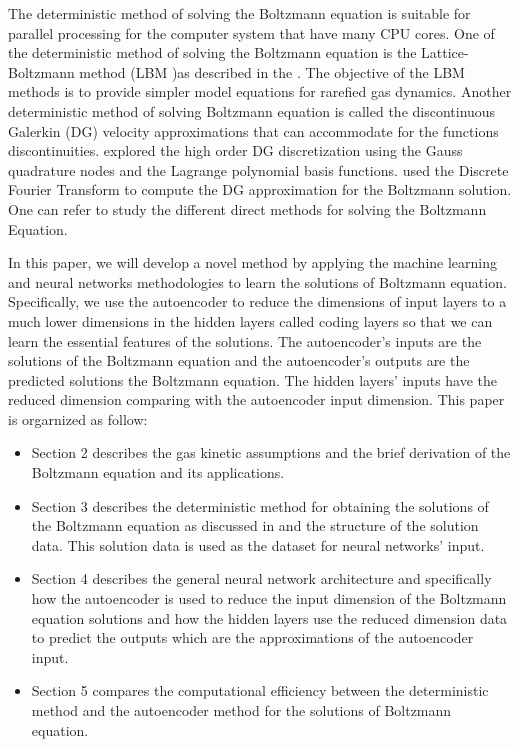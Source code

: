 \documentclass{article}
\begin{document}
The deterministic method of solving the Boltzmann equation is suitable for parallel processing for the computer system that have many CPU cores. One of the deterministic method of solving the Boltzmann equation is the Lattice-Boltzmann method (LBM )as described in the \cite{LBM1, LBM2}. The objective of the LBM methods is to provide simpler model equations for rarefied gas dynamics. Another deterministic method of solving Boltzmann equation is called the discontinuous Galerkin (DG) velocity approximations that can accommodate for the functions discontinuities. \cite{Alekseenko1, Alekseenko2} explored the high order DG discretization using the Gauss quadrature nodes and the Lagrange polynomial basis functions. \cite{Alekseenko4} used the Discrete Fourier Transform to compute the DG approximation for the Boltzmann solution. One can refer \cite{VVAristo} to study the different direct methods for solving the Boltzmann Equation.

In this paper, we will develop a novel method by applying the machine learning and neural networks methodologies to learn the solutions of Boltzmann equation. Specifically, we use the autoencoder to reduce the dimensions of  input layers to a much lower dimensions in the hidden layers called coding layers so that we can learn the essential features of the solutions. The autoencoder's inputs are the solutions of the Boltzmann equation and the autoencoder's outputs are the predicted solutions the Boltzmann equation. The hidden layers' inputs have the reduced dimension comparing with the autoencoder input dimension. This paper is orgarnized as follow:
\begin{itemize}
	\item Section 2 describes the gas kinetic assumptions and the brief derivation of the Boltzmann equation and its applications.
	\item Section 3 describes the deterministic method for obtaining the solutions of the Boltzmann equation as discussed in \cite{Alekseenko2, Alekseenko4} and the structure of the solution data. This solution data is used as the dataset for neural networks' input.
	\item Section 4 describes the general neural network architecture and specifically how the autoencoder is used to reduce the input dimension of the Boltzmann equation solutions and how the hidden layers use the reduced dimension data to predict the outputs which are the approximations of the autoencoder input.
	\item Section 5 compares the computational efficiency between the deterministic method and the autoencoder method for the solutions of Boltzmann equation.
\end{itemize}
\end{document}
